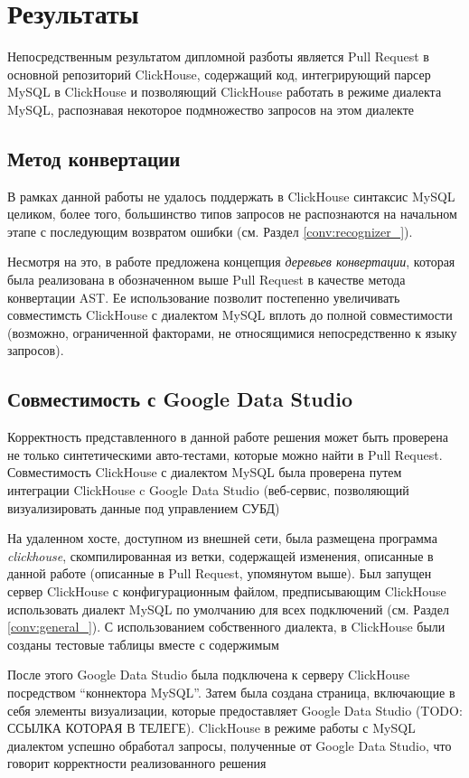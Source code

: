 \section{Результаты} \label{chap:results}
Непосредственным результатом дипломной разботы является Pull Request в основной репозиторий ClickHouse, содержащий код, интегрирующий парсер MySQL в ClickHouse и позволяющий ClickHouse работать в режиме диалекта MySQL, распознавая некоторое подмножество запросов на этом диалекте

\subsection{Метод конвертации}
В рамках данной работы не удалось поддержать в ClickHouse синтаксис MySQL целиком, более того, большинство типов запросов не распознаются на начальном этапе с последующим возвратом ошибки (см. Раздел \ref{conv:recognizer_}).

Несмотря на это, в работе предложена концепция \textit{деревьев конвертации}, которая была реализована в обозначенном выше Pull Request в качестве метода конвертации AST. Ее использование позволит постепенно увеличивать совместимсть ClickHouse с диалектом MySQL вплоть до полной совместимости (возможно, ограниченной факторами, не относящимися непосредственно к языку запросов). 

\subsection{Совместимость с Google Data Studio} \label{res:google}
Корректность представленного в данной работе решения может быть проверена не только синтетическими авто-тестами, которые можно найти в Pull Request. Совместимость ClickHouse с диалектом MySQL была проверена путем интеграции ClickHouse c Google Data Studio (веб-сервис, позволяющий визуализировать данные под управлением СУБД)

На удаленном хосте, доступном из внешней сети, была размещена программа \textit{clickhouse}, скомпилированная из ветки, содержащей изменения, описанные в данной работе (описанные в Pull Request, упомянутом выше). Был запущен сервер ClickHouse с конфигурационным файлом, предписывающим ClickHouse использовать диалект MySQL по умолчанию для всех подключений (см. Раздел \ref{conv:general_}). С использованием собственного диалекта, в ClickHouse были созданы тестовые таблицы вместе с содержимым

После этого Google Data Studio была подключена к серверу ClickHouse посредством \enquote{коннектора MySQL}. Затем была создана страница, включающие в себя элементы визуализации, которые предоставляет Google Data Studio (TODO: ССЫЛКА КОТОРАЯ В ТЕЛЕГЕ). ClickHouse в режиме работы с MySQL диалектом успешно обработал запросы, полученные от Google Data Studio, что говорит корректности реализованного решения

